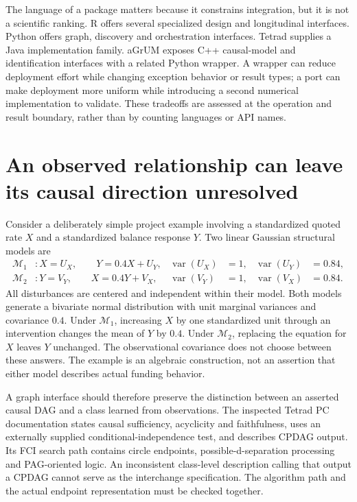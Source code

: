 The language of a package matters because it constrains integration, but it is
not a scientific ranking. R offers several specialized design and longitudinal
interfaces. Python offers graph, discovery and orchestration interfaces.
Tetrad supplies a Java implementation family. aGrUM exposes C++ causal-model
and identification interfaces with a related Python wrapper. A wrapper can
reduce deployment effort while changing exception behavior or result types;
a port can make deployment more uniform while introducing a second numerical
implementation to validate. These tradeoffs are assessed at the operation and
result boundary, rather than by counting languages or API names.

\section{An observed relationship can leave its causal direction unresolved}

Consider a deliberately simple project example involving a standardized quoted
rate \(X\) and a standardized balance response \(Y\). Two linear Gaussian
structural models are
\begin{align}
 \mathcal M_1 &: X=U_X,\qquad Y=0.4X+U_Y,
    &\operatorname{var}(U_X)&=1,&\operatorname{var}(U_Y)&=0.84,\\
 \mathcal M_2 &: Y=V_Y,\qquad X=0.4Y+V_X,
    &\operatorname{var}(V_Y)&=1,&\operatorname{var}(V_X)&=0.84.
\end{align}
All disturbances are centered and independent within their model. Both models
generate a bivariate normal distribution with unit marginal variances and
covariance \(0.4\). Under \(\mathcal M_1\), increasing \(X\) by one standardized
unit through an intervention changes the mean of \(Y\) by \(0.4\). Under
\(\mathcal M_2\), replacing the equation for \(X\) leaves \(Y\) unchanged. The
observational covariance does not choose between these answers. The example
is an algebraic construction, not an assertion that either model describes
actual funding behavior.

A graph interface should therefore preserve the distinction between an
asserted causal DAG and a class learned from observations. The inspected
Tetrad PC documentation states causal sufficiency, acyclicity and faithfulness,
uses an externally supplied conditional-independence test, and describes CPDAG
output. Its FCI search path contains circle endpoints, possible-d-separation
processing and PAG-oriented logic. An inconsistent class-level description
calling that output a CPDAG cannot serve as the interchange specification.
The algorithm path and the actual endpoint representation must be checked
together. \citep{v12_sw_tetrad}

